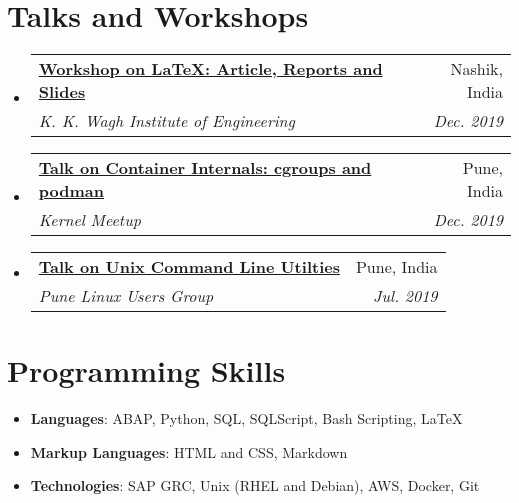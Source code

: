 \documentclass[letterpaper,11pt]{article}
\makeatletter
\newcommand{\resumeSubheading}[4]{
  \vspace{-1pt}\item
    \begin{tabular*}{0.97\textwidth}[t]{l@{\extracolsep{\fill}}r}
      \textbf{#1} & #2 \\
      \textit{\small#3} & \textit{\small #4} \\
    \end{tabular*}\vspace{-5pt}
}
\newcommand{\resumeSubHeadingListStart}{\begin{itemize}[leftmargin=*]}
\newcommand{\resumeSubHeadingListEnd}{\end{itemize}}
\makeatother
\begin{document}
\section{Talks and Workshops}
	\resumeSubHeadingListStart
	  	\resumeSubheading
		{\href{https://github.com/whereistejas/latex-workshop}{Workshop on LaTeX: Article, Reports and Slides}}{Nashik, India}
		  {K. K. Wagh Institute of Engineering}{Dec. 2019}
	  	\resumeSubheading
		{\href{https://github.com/whereistejas/plug-containers-talk}{Talk on Container Internals: cgroups and podman}}{Pune, India}
		  {Kernel Meetup}{Dec. 2019}
	  	\resumeSubheading
		{\href{https://github.com/whereistejas/plug-command-line}{Talk on Unix Command Line Utilties}}{Pune, India}
		  {Pune Linux Users Group}{Jul. 2019}
	\resumeSubHeadingListEnd

\section{Programming Skills}
	\resumeSubHeadingListStart
		\item{\textbf{Languages}{: ABAP, Python, SQL, SQLScript, Bash Scripting, LaTeX} }
			\hfill
		\item{\textbf{Markup Languages}{: HTML and CSS, Markdown} }
			\hfill
		\item{\textbf{Technologies}{: SAP GRC, Unix (RHEL and Debian), AWS, Docker, Git} }
			\hfill
	\resumeSubHeadingListEnd

\end{document}
